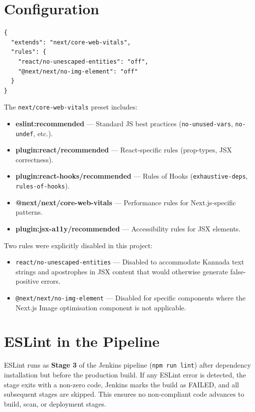 \documentclass[12pt,a4paper,oneside]{report}
\begin{document}
\section{Configuration}

\begin{lstlisting}
{
  "extends": "next/core-web-vitals",
  "rules": {
    "react/no-unescaped-entities": "off",
    "@next/next/no-img-element": "off"
  }
}
\end{lstlisting}

The \texttt{next/core-web-vitals} preset includes:

\begin{itemize}
  \item \textbf{eslint:recommended} --- Standard JS best practices
        (\texttt{no-unused-vars}, \texttt{no-undef}, etc.).
  \item \textbf{plugin:react/recommended} --- React-specific rules
        (prop-types, JSX correctness).
  \item \textbf{plugin:react-hooks/recommended} --- Rules of Hooks
        (\texttt{exhaustive-deps}, \texttt{rules-of-hooks}).
  \item \textbf{@next/next/core-web-vitals} --- Performance rules for
        Next.js-specific patterns.
  \item \textbf{plugin:jsx-a11y/recommended} --- Accessibility rules for JSX
        elements.
\end{itemize}

Two rules were explicitly disabled in this project:

\begin{itemize}
  \item \texttt{react/no-unescaped-entities} --- Disabled to accommodate Kannada
        text strings and apostrophes in JSX content that would otherwise generate
        false-positive errors.
  \item \texttt{@next/next/no-img-element} --- Disabled for specific components
        where the Next.js Image optimisation component is not applicable.
\end{itemize}

\section{ESLint in the Pipeline}

ESLint runs as \textbf{Stage 3} of the Jenkins pipeline (\texttt{npm run lint}) after
dependency installation but before the production build. If any ESLint error is
detected, the stage exits with a non-zero code, Jenkins marks the build as FAILED,
and all subsequent stages are skipped. This ensures no non-compliant code advances to
build, scan, or deployment stages.
\end{document}
